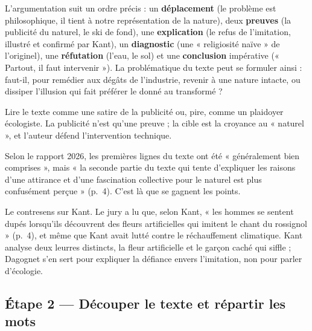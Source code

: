 \documentclass[11pt,a4paper]{article}
\begin{document}
L'argumentation suit un ordre précis : un \textbf{déplacement} (le problème est philosophique, il tient à notre représentation de la nature), deux \textbf{preuves} (la publicité du naturel, le ski de fond), une \textbf{explication} (le refus de l'imitation, illustré et confirmé par Kant), un \textbf{diagnostic} (une « religiosité naïve » de l'originel), une \textbf{réfutation} (l'eau, le sol) et une \textbf{conclusion} impérative (« Partout, il faut intervenir »). La problématique du texte peut se formuler ainsi : faut-il, pour remédier aux dégâts de l'industrie, revenir à une nature intacte, ou dissiper l'illusion qui fait préférer le donné au transformé ?

\begin{piege}

Lire le texte comme une satire de la publicité ou, pire, comme un plaidoyer écologiste. La publicité n'est qu'une preuve ; la cible est la croyance au « naturel », et l'auteur défend l'intervention technique.

\end{piege}

\begin{jury}

Selon le rapport 2026, les premières lignes du texte ont été « généralement bien comprises », mais « la seconde partie du texte qui tente d'expliquer les raisons d'une attirance et d'une fascination collective pour le naturel est plus confusément perçue » (p.~4). C'est là que se gagnent les points.

\end{jury}

\begin{piege}

Le contresens sur Kant. Le jury a lu que, selon Kant, « les hommes se sentent dupés lorsqu'ils découvrent des fleurs artificielles qui imitent le chant du rossignol » (p.~4), et même que Kant avait lutté contre le réchauffement climatique. Kant analyse deux leurres distincts, la fleur artificielle et le garçon caché qui siffle ; Dagognet s'en sert pour expliquer la défiance envers l'imitation, non pour parler d'écologie.

\end{piege}

\hypertarget{uxe9tape-2-duxe9couper-le-texte-et-ruxe9partir-les-mots}{%
\subsection{Étape 2 --- Découper le texte et répartir les mots}\label{uxe9tape-2-duxe9couper-le-texte-et-ruxe9partir-les-mots}}
\end{document}
